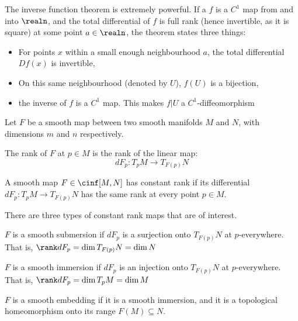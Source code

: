 \documentclass[../main-v2-manifolds.tex]{subfiles}
\begin{document}
\begin{remark}
    The inverse function theorem is extremely powerful. If a $f$ is a $C^1$ map from and into $\realn$, and the total differential of $f$ is full rank (hence invertible, as it is square) at some point $a\in\realn$, the theorem states three things:
    \begin{itemize}
        \item For points $x$ within a small enough neighbourhood $a$, the total differential $Df(x)$ is invertible,
        \item On this same neighbourhood (denoted by $U$), $f(U)$ is a bijection,
        \item the inverse of $f$ is a $C^1$ map. This makes $f|U$ a $C^1$-diffeomorphism
    \end{itemize}
\end{remark}

Let $F$ be a smooth map between two smooth manifolds $M$ and $N$, with dimensions $m$ and $n$ respectively.


\begin{definition}
    The rank of $F$ at $p\in M$ is the rank of the linear map:
\[
    dF_p: T_pM\to T_{F(p)}N
\]\end{definition}

\begin{definition}
A smooth map $F\in \cinf[M,N]$ has constant rank if its differential $dF_p: T_pM\to T_{F(p)}N$ has the same rank at every point $p\in M$.\end{definition}

There are three types of constant rank maps that are of interest. 
\begin{definition}\label{lee-chp4:smooth-submersion-definition}
    $F$ is a smooth submersion if $dF_p$ is a surjection onto $T_{F(p)}N$ at $p$-everywhere. That is, $\rank dF_p = \dim T_{F(p)}N = \dim N$\end{definition}

\begin{definition}\label{lee-chp4:smooth-immersion-definition}
    $F$ is a smooth immersion if $dF_p$ is an injection onto $T_{F(p)}N$ at $p$-everywhere. That is, $\rank dF_p = \dim T_{p}M = \dim M$\end{definition}


\begin{definition}\label{lee-chp4:smooth-embedding-definition}
    $F$ is a smooth embedding if it is a smooth immersion, and it is a topological homeomorphism onto its range $F(M)\subseteq N$. 
\end{definition}
\end{document}
